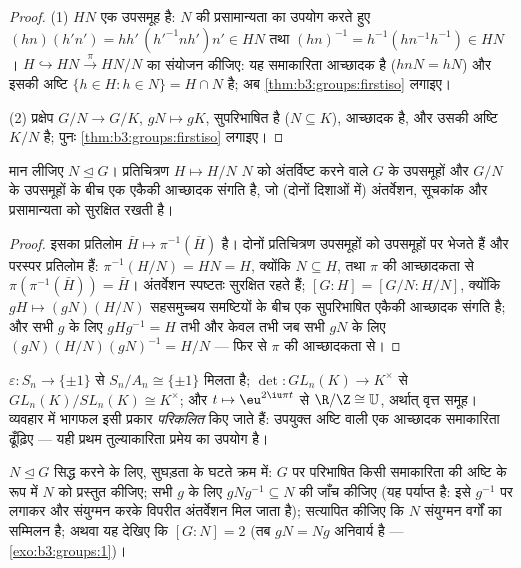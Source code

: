 \begin{proof}
(1) $HN$ एक उपसमूह है: $N$ की प्रसामान्यता का उपयोग करते हुए
$(hn)(h'n') = hh'\,(h'^{-1}nh')n' \in HN$ तथा $(hn)^{-1} = h^{-1}(hn^{-1}h^{-1}) \in HN$। $H \hookrightarrow HN \xrightarrow{\pi} HN/N$ का संयोजन कीजिए: यह समाकारिता आच्छादक है
($hnN = hN$) और इसकी अष्टि $\{h \in H : h \in
N\} = H \cap N$ है; अब \cref{thm:b3:groups:firstiso} लगाइए।

(2) प्रक्षेप $G/N \to G/K$, $gN \mapsto gK$, सुपरिभाषित है ($N \subseteq K$), आच्छादक है, और
उसकी अष्टि $K/N$ है; पुनः \cref{thm:b3:groups:firstiso} लगाइए।
\end{proof}

\begin{theorem}[संगति प्रमेय]\label{thm:b3:groups:correspondence}
मान लीजिए $N \trianglelefteq G$। प्रतिचित्रण $H \mapsto H/N$ $N$ को अंतर्विष्ट करने वाले
$G$ के उपसमूहों और $G/N$ के उपसमूहों के बीच एक एकैकी आच्छादक
संगति है, जो (दोनों दिशाओं में) अंतर्वेशन, सूचकांक और
प्रसामान्यता को सुरक्षित रखती है।
\end{theorem}

\begin{proof}
इसका प्रतिलोम $\bar H \mapsto \pi^{-1}(\bar H)$ है। दोनों प्रतिचित्रण उपसमूहों को उपसमूहों पर
भेजते हैं और परस्पर प्रतिलोम हैं: $\pi^{-1}(H/N) =
HN = H$, क्योंकि $N \subseteq H$, तथा $\pi$
की आच्छादकता से $\pi(\pi^{-1}(\bar H)) = \bar H$। अंतर्वेशन स्पष्टतः सुरक्षित रहते हैं;
$[G:H] = [G/N : H/N]$, क्योंकि $gH \mapsto (gN)(H/N)$ सहसमुच्चय समष्टियों के बीच एक सुपरिभाषित
एकैकी आच्छादक संगति है; और सभी $g$ के लिए $gHg^{-1} = H$ तभी और केवल तभी
जब सभी $gN$ के लिए $(gN)(H/N)(gN)^{-1} = H/N$ --- फिर से $\pi$ की आच्छादकता से।
\end{proof}

\begin{example}\label{ex:b3:groups:firstiso}
$\varepsilon \colon S_n \to \{\pm 1\}$ से $S_n/A_n \cong
\{\pm1\}$ मिलता है; $\det \colon GL_n(K) \to K^\times$ से $GL_n(K)/SL_n(K) \cong K^\times$; और $t \mapsto \eu^{2\iu\pi t}$ से $\R/\Z \cong \mathbb U$,
अर्थात् वृत्त समूह। व्यवहार में भागफल इसी प्रकार \emph{परिकलित}
किए जाते हैं: उपयुक्त अष्टि वाली एक आच्छादक समाकारिता ढूँढ़िए
--- यही प्रथम तुल्याकारिता प्रमेय का उपयोग है।
\end{example}

\begin{method}\label{met:b3:groups:normal}
$N \trianglelefteq G$ सिद्ध करने के लिए, सुघड़ता के घटते क्रम में: $G$ पर
परिभाषित किसी समाकारिता की अष्टि के रूप में $N$ को प्रस्तुत
कीजिए; सभी $g$ के लिए $gNg^{-1} \subseteq N$ की जाँच कीजिए (यह पर्याप्त है:
इसे $g^{-1}$ पर लगाकर और संयुग्मन करके विपरीत अंतर्वेशन मिल जाता
है); सत्यापित कीजिए कि $N$ संयुग्मन वर्गों का सम्मिलन है; अथवा
यह देखिए कि $[G:N] = 2$ (तब $gN = Ng$ अनिवार्य है --- \cref{exo:b3:groups:1})।
\end{method}

